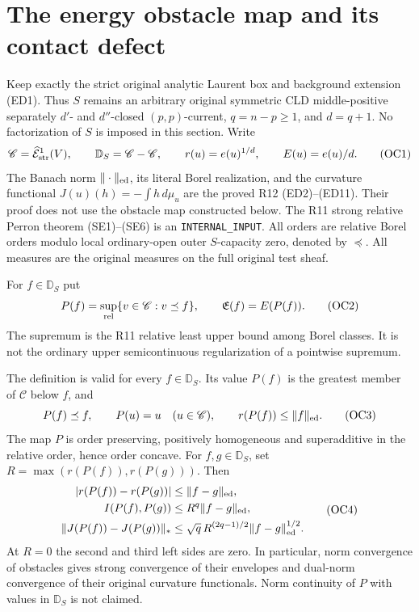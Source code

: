 \section{The energy obstacle map and its contact defect}
\label{sec:r12-energy-obstacles}

Keep exactly the strict original analytic Laurent box and background
extension \textup{(ED1)}.  Thus $S$ remains an arbitrary original
symmetric CLD middle-positive separately $d'$- and $d''$-closed
$(p,p)$-current, $q=n-p\ge1$, and $d=q+1$.  No factorization of
$S$ is imposed in this section.  Write
\[
 \mathscr C=\widehat{\mathcal E}^{1}_{\rm str}(V),\qquad
 \mathbb D_S=\mathscr C-\mathscr C,\qquad
 r(u)=e(u)^{1/d},\qquad E(u)=e(u)/d.
 \tag{OC1}
\]
The Banach norm $\|\cdot\|_{\rm ed}$, its literal Borel
realization, and the curvature functional
$J(u)(h)=-\int h\,d\widehat\mu_u$ are the proved R12
\textup{(ED2)--(ED11)}.  Their proof does not use the obstacle
map constructed below.  The R11 strong relative Perron theorem
\textup{(SE1)--(SE6)} is an \texttt{INTERNAL\_INPUT}.
All orders are relative Borel orders modulo local ordinary-open
outer $S$-capacity zero, denoted by $\preceq$.  All measures are
the original measures on the full original test sheaf.

\begin{definition}
\label{def:r12-energy-obstacle}
For $f\in\mathbb D_S$ put
\[
 P(f)=\sup_{\rm rel}\{v\in\mathscr C:v\preceq f\},
 \qquad \mathfrak E(f)=E(P(f)).
 \tag{OC2}
\]
The supremum is the R11 relative least upper bound among Borel
classes.  It is not the ordinary upper semicontinuous
regularization of a pointwise supremum.
\end{definition}

\begin{theorem}
\label{thm:r12-global-energy-obstacle}
The definition is valid for every $f\in\mathbb D_S$.  Its value
$P(f)$ is the greatest member of $\mathscr C$ below $f$, and
\[
 P(f)\preceq f,\qquad P(u)=u\quad(u\in\mathscr C),\qquad
 r(P(f))\le\|f\|_{\rm ed}.
 \tag{OC3}
\]
The map $P$ is order preserving, positively homogeneous and
superadditive in the relative order, hence order concave.
For $f,g\in\mathbb D_S$, set
$R=\max(r(P(f)),r(P(g)))$.  Then
\[
 \begin{split}
 |r(P(f))-r(P(g))|&\le\|f-g\|_{\rm ed},\\
 I(P(f),P(g))&\le R^q\|f-g\|_{\rm ed},\\
 \|J(P(f))-J(P(g))\|_*
       &\le\sqrt q\,R^{(2q-1)/2}\|f-g\|_{\rm ed}^{1/2}.
 \end{split}
 \tag{OC4}
\]
At $R=0$ the second and third left sides are zero.  In
particular, norm convergence of obstacles gives strong
convergence of their envelopes and dual-norm convergence of
their original curvature functionals.  Norm continuity of
$P$ with values in $\mathbb D_S$ is not claimed.
\end{theorem}

